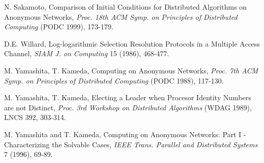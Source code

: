 \documentclass[a4paper,10pt]{article}
\begin{document}
\begin{thebibliography}{99}
N. Sakamoto,
Comparison of Initial Conditions for Distributed Algorithms
on Anonymous  Networks,
{\em Proc. 18th ACM Symp. on Principles of Distributed Computing} (PODC 1999), 173-179.

D.E. Willard, 
Log-logarithmic Selection Resolution Protocols in a Multiple Access Channel,
{\em SIAM J. on Computing} 15 (1986), 468-477. 

M. Yamashita, T. Kameda,
Computing on Anonymous Networks,
{\em Proc. 7th ACM Symp. on Principles of Distributed Computing} (PODC 1988), 117-130.

M. Yamashita, T. Kameda,
Electing a Leader when Procesor Identity Numbers are not Distinct,
{\em Proc. 3rd Workshop on Distributed Algorithms} (WDAG 1989), LNCS 392, 303-314.

M. Yamashita and T. Kameda,
Computing on Anonymous Networks: Part I - Characterizing the Solvable Cases,
{\em IEEE Trans. Parallel and Distributed Systems} 7 (1996), 69-89. 

\end{thebibliography}
\end{document}
